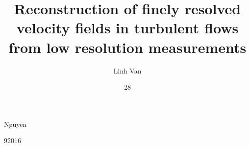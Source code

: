 \author[linh.van.nguyen@hotmail.com]{Linh Van}{Nguyen}
%
\title[Reconstruction fine de champ de vitesses d'un écoulement turbulent à partir de mesures faiblements résolues]{Reconstruction of finely resolved velocity fields in turbulent flows from low resolution measurements}
%
%
%
%
\date{28}{9}{2016}
%
\subject[Reconstruction fine de champ de vitesses d'un écoulement turbulent à l'aide de données expérimentales faiblements résolues]{Reconstruction of finely resolved velocity vector fields in turbulent flows from low resolution measurements}
%
%

%


%
%

